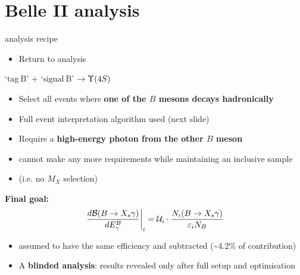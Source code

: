 \documentclass[xcolor=dvipsnames]{beamer}
\begin{document}
   \section{Belle II analysis}

   \begin{frame}{\BtoXsgamma analysis recipe}
      \scriptsize\centering
      \begin{itemize}
         \item Return to \BtoXsgamma analysis
      \end{itemize}
      
      `$\mathrm{tag~B}$' + `$\mathrm{signal~B}$' $\ra \FourS$
     
      \begin{itemize}
         \item Select all events where \textbf{one of the $B$ mesons decays hadronically}
         \item[\to] Full event interpretation algorithm used (next slide)
         \item Require a \textbf{high-energy photon from the other $B$ meson}
         \item[\to] cannot make any more requirements while maintaining an inclusive sample 
         \item[] (i.e. no $M_X$ selection)
      \end{itemize}
\textbf{Final goal:}
      \begin{equation}\nonumber
         \left.\frac{d\mathcal{B}(\BtoXsgamma)}{d\EB}\right|_i = \mathcal{U}_i \cdot \frac{N_i(\BtoXsgamma)}{\varepsilon_i N_{B}}
      \end{equation}
      \begin{itemize}
         \item \BtoXdgamma assumed to have the same efficiency and subtracted (\sim 4.2\% of contribution)
         \item A \textbf{blinded analysis}: results revealed only after full setup and optimisation
      \end{itemize}

   \end{frame}
\end{document}
